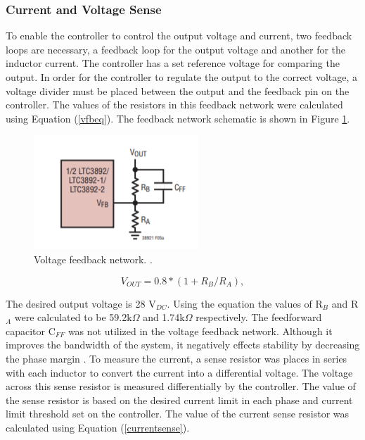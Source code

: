 \documentclass[11pt]{article}
\begin{document}
     \subsubsection{Current and Voltage Sense}
    \noindent To enable the controller to control the output voltage and current, two feedback loops are necessary, a feedback loop for the output voltage and another for the inductor current. The controller has a set reference voltage for comparing the output. In order for the controller to regulate the output to the correct voltage, a voltage divider must be placed between the output and the feedback pin on the controller. The values of the resistors in this feedback network were calculated using Equation (\ref{vfbeq}). The feedback network schematic is shown in Figure \ref{vfbpin}.
    
    \begin{figure} [H]
        \centering
        \includegraphics{vfeedback.PNG}
        \caption{Voltage feedback network. \cite{linear_technology_ltc3892:_nodate}.}
        \label{vfbpin}
    \end{figure}
    
    \begin{equation}
        V_{OUT} = 0.8*(1+R_B/R_A),
        \label{vfbeq}
    \end{equation}
    
    \noindent The desired output voltage is 28 V$_{DC}$. Using the equation the values of R$_B$ and R$_A$ were calculated to be 59.2k$\Omega$ and 1.74k$\Omega$ respectively. The feedforward capacitor C$_{FF}$ was not utilized in the voltage feedback network. Although it improves the bandwidth of the system, it negatively effects stability by decreasing the phase margin \cite{linear_technology_ltc3892:_nodate}.
    \newline
    \newline
    \noindent To measure the current, a sense resistor was places in series with each inductor to convert the current into a differential voltage. The voltage across this sense resistor is measured differentially by the controller. The value of the sense resistor is based on the desired current limit in each phase and current limit threshold set on the controller. The value of the current sense resistor was calculated using Equation (\ref{currentsense}).
    
\end{document}
